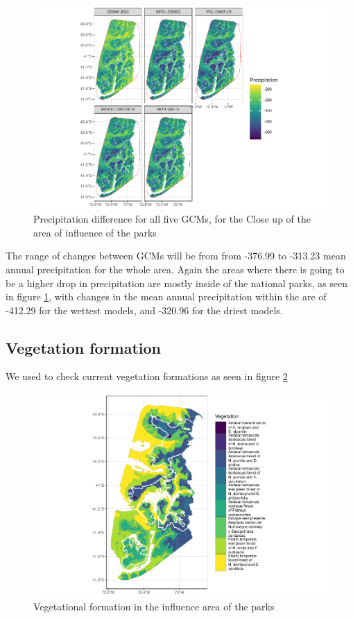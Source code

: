 \documentclass[]{article}
\begin{document}
\begin{figure}
\centering
\includegraphics{Review_and_climate_files/figure-latex/DifPrecHull-1.pdf}
\caption{\label{fig:DifPrecHull}Precipitation difference for all five GCMs, for the Close up of the area of influence of the parks}
\end{figure}

The range of changes between GCMs will be from from -376.99 to -313.23 mean annual precipitation for the whole area. Again the areas where there is going to be a higher drop in precipitation are mostly inside of the national parks, as seen in figure \ref{fig:DifPrecHull}, with changes in the mean annual precipitation within the are of -412.29 for the wettest models, and -320.96 for the driest models.

\hypertarget{vegetation-formation}{%
\subsection{Vegetation formation}\label{vegetation-formation}}

We used \citet{luebert2009depuracion} to check current vegetation formations as seen in figure \ref{fig:VegHull}

\begin{figure}
\centering
\includegraphics{Review_and_climate_files/figure-latex/VegHull-1.pdf}
\caption{\label{fig:VegHull}Vegetational formation in the influence area of the parks}
\end{figure}
\end{document}

